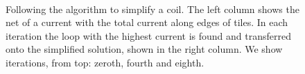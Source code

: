 \begin{figure}
  \\
  \caption{Following the algorithm to simplify a coil. The left column shows the net of a current with the total current along edges of tiles. In each iteration the loop with the highest current is found and transferred onto the simplified solution, shown in the right column. We show iterations, from top: zeroth, fourth and eighth.}\label{fig:simplification_algorithm}
\end{figure}

